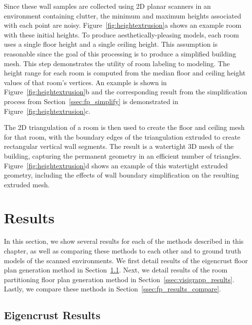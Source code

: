 \documentclass[12pt,onecolumn,oneside]{book}
\begin{document}
Since these wall samples are collected using 2D planar scanners in an environment containing clutter, the minimum and maximum heights associated with each point are noisy.  Figure~\ref{fig:heightextrusion}a shows an example room with these initial heights.  To produce aesthetically-pleasing models, each room uses a single floor height and a single ceiling height.  This assumption is reasonable since the goal of this processing is to produce a simplified building mesh.  This step demonstrates the utility of room labeling to modeling.  The height range for each room is computed from the median floor and ceiling height values of that room's vertices.  An example is shown in Figure~\ref{fig:heightextrusion}b and the corresponding result from the simplification process from Section~\ref{ssec:fp_simplify} is demonstrated in Figure~\ref{fig:heightextrusion}c.

The 2D triangulation of a room is then used to create the floor and ceiling mesh for that room, with the boundary edges of the triangulation extruded to create rectangular vertical wall segments.  The result is a watertight 3D mesh of the building, capturing the permanent geometry in an efficient number of triangles.  Figure~\ref{fig:heightextrusion}d shows an example of this watertight extruded geometry, including the effects of wall boundary simplification on the resulting extruded mesh.

\section{Results}
\label{sec:fp_results}

In this section, we show several results for each of the methods described in this chapter, as well as comparing these methods to each other and to ground truth models of the scanned environments.  We first detail results of the eigencrust floor plan generation method in Section~\ref{ssec:eigencrust_results}.  Next, we detail results of the room partitioning floor plan generation method in Section~\ref{ssec:visigrapp_results}.  Lastly, we compare these methods in Section~\ref{ssec:fp_results_compare}.

\subsection{Eigencrust Results}
\label{ssec:eigencrust_results}

\end{document}
